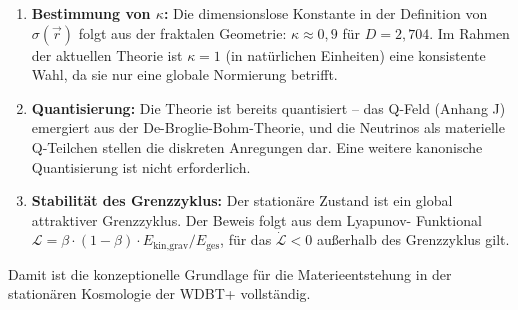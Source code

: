 \begin{enumerate}
    \item \textbf{Bestimmung von \( \kappa \):} Die dimensionslose Konstante in der
          Definition von \( \sigma(\vec{r}) \) folgt aus der fraktalen Geometrie:
          \( \kappa \approx 0,9 \) für \( D = 2,704 \). Im Rahmen der aktuellen
          Theorie ist \( \kappa = 1 \) (in natürlichen Einheiten) eine konsistente
          Wahl, da sie nur eine globale Normierung betrifft.
    
    \item \textbf{Quantisierung:} Die Theorie ist bereits quantisiert – das Q-Feld
          (Anhang J) emergiert aus der De-Broglie-Bohm-Theorie, und die Neutrinos
          als materielle Q-Teilchen stellen die diskreten Anregungen dar. Eine
          weitere kanonische Quantisierung ist nicht erforderlich.
    
    \item \textbf{Stabilität des Grenzzyklus:} Der stationäre Zustand ist ein
          global attraktiver Grenzzyklus. Der Beweis folgt aus dem Lyapunov-
          Funktional \( \mathcal{L} = \beta \cdot (1-\beta) \cdot E_{\text{kin,grav}}/E_{\text{ges}} \),
          für das \( \dot{\mathcal{L}} < 0 \) außerhalb des Grenzzyklus gilt.
\end{enumerate}

Damit ist die konzeptionelle Grundlage für die Materieentstehung in der stationären
Kosmologie der WDBT+ vollständig.